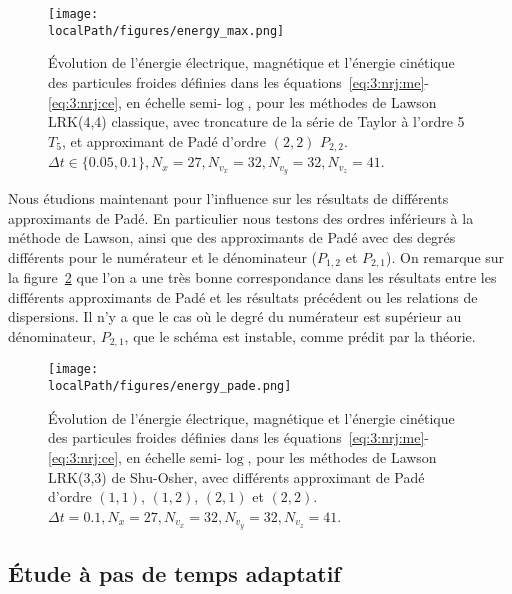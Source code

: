 \begin{figure}[h]
  \centering
  \texttt{[image: \\localPath/figures/energy\_max.png]}
  \caption{Évolution de l'énergie électrique, magnétique et l'énergie cinétique des particules froides définies dans les équations~\ref{eq:3:nrj:me}-\ref{eq:3:nrj:ce}, en échelle semi-$\log$, pour les méthodes de Lawson LRK(4,4) classique, avec troncature de la série de Taylor à l'ordre 5 $T_5$, et approximant de Padé d'ordre $(2,2)$ $P_{2,2}$. $\Delta t \in \{0.05,0.1\}, N_x=27, N_{v_x}=32, N_{v_y}=32, N_{v_z}=41$.}
  \label{fig:approx:energies:cfl}
\end{figure}

Nous étudions maintenant pour l'influence sur les résultats de différents approximants de Padé. En particulier nous testons des ordres inférieurs à la méthode de Lawson, ainsi que des approximants de Padé avec des degrés différents pour le numérateur et le dénominateur ($P_{1,2}$ et $P_{2,1}$). On remarque sur la figure~\ref{fig:approx:energies:pade} que l'on a une très bonne correspondance dans les résultats entre les différents approximants de Padé et les résultats précédent ou les relations de dispersions. Il n'y a que le cas où le degré du numérateur est supérieur au dénominateur, $P_{2,1}$, que le schéma est instable, comme prédit par la théorie. 

\begin{figure}[h]
  \centering
  \texttt{[image: \\localPath/figures/energy\_pade.png]}
  \caption{Évolution de l'énergie électrique, magnétique et l'énergie cinétique des particules froides définies dans les équations~\ref{eq:3:nrj:me}-\ref{eq:3:nrj:ce}, en échelle semi-$\log$, pour les méthodes de Lawson LRK(3,3) de Shu-Osher, avec différents approximant de Padé d'ordre $(1,1)$, $(1,2)$, $(2,1)$ et $(2,2)$. $\Delta t = 0.1, N_x=27, N_{v_x}=32, N_{v_y}=32, N_{v_z}=41$.}
  \label{fig:approx:energies:pade}
\end{figure}


\FloatBarrier
\subsection{Étude à pas de temps adaptatif}

